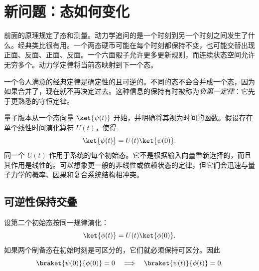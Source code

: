 \begin{classroomqa}
\end{classroomqa}

\begin{classroomqa}
\end{classroomqa}

\section{新问题：态如何变化}

前面的原理规定了态和测量。动力学追问的是一个时刻到另一个时刻之间发生了什么。经典类比很有用。一个两态硬币可能在每个时刻都保持不变，也可能交替出现正面、反面、正面、反面。一个六面骰子允许更多更新规则，而连续状态空间允许无穷多个。动力学定律将当前态映射到下一个态。

一个令人满意的经典定律是确定性的且可逆的。不同的态不会合并成一个态，因为如果合并了，现在就不再决定过去。这种信息的保持有时被称为\emph{负第一定律}：它先于更熟悉的守恒定律。

量子版本从一个态向量 \(\ket{\psi(t)}\) 开始，并明确将其视为时间的函数。假设存在单个线性时间演化算符 \(U(t)\)，使得
\begin{equation}
\ket{\psi(t)}=U(t)\ket{\psi(0)}.
\label{eq:l4-time-development}
\end{equation}
同一个 \(U(t)\) 作用于系统的每个初始态。它不是根据输入向量重新选择的，而且其作用是线性的。可以想象更一般的非线性或依赖状态的定律，但它们会迅速与量子力学的概率、因果和复合系统结构相冲突。

\subsection{可逆性保持交叠}

设第二个初始态按同一规律演化：
\begin{equation}
\ket{\phi(t)}=U(t)\ket{\phi(0)}.
\end{equation}
如果两个制备态在初始时刻是可区分的，它们就必须保持可区分。因此
\begin{equation}
\braket{\psi(0)}{\phi(0)}=0
\quad\Longrightarrow\quad
\braket{\psi(t)}{\phi(t)}=0.
\end{equation}

